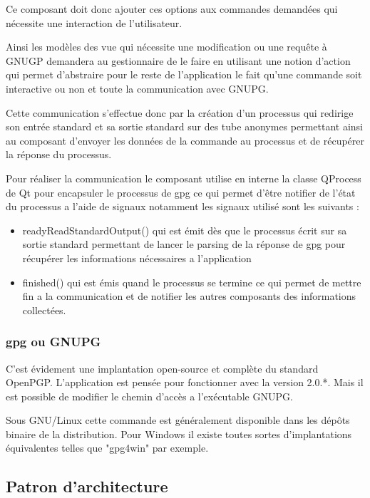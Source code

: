 \documentclass{../res/univ-projet}
\begin{document}
      Ce composant doit donc ajouter ces options aux commandes demandées qui nécessite une interaction de l'utilisateur.

      Ainsi les modèles des vue qui nécessite une modification ou une requête à GNUGP demandera au gestionnaire de le faire
      en utilisant une notion d'action qui permet d'abstraire pour le reste de l'application le fait qu'une commande soit
      interactive ou non et toute la communication avec GNUPG.

      Cette communication s'effectue donc par la création d'un processus qui redirige son entrée standard et sa sortie standard
      sur des tube anonymes permettant ainsi au composant d'envoyer les données de la commande au processus et de récupérer la
      réponse du processus.

      Pour réaliser la communication le composant utilise en interne la classe QProcess de Qt pour encapsuler le processus de gpg
      ce qui permet d'être notifier de l'état du processus a l'aide de signaux notamment les signaux utilisé sont les suivants :
      \begin{itemize}
        \item readyReadStandardOutput() qui est émit dès que le processus écrit sur sa sortie standard
        permettant de lancer le parsing de la réponse de gpg pour récupérer les informations nécessaires a l'application
        \item finished() qui est émis quand le processus se termine ce qui permet de mettre fin a la communication
        et de notifier les autres composants des informations collectées.
      \end{itemize}


    \subsubsection{gpg ou GNUPG}

      C'est évidement une implantation open-source et complète du standard OpenPGP.
      L'application est pensée pour fonctionner avec la version 2.0.*.
      Mais il est possible de modifier le chemin d’accès a l’exécutable GNUPG.

      Sous GNU/Linux cette commande est généralement disponible dans les dépôts binaire de la distribution.
      Pour Windows il existe toutes sortes d'implantations équivalentes telles que "gpg4win" par exemple.


  \newpage
  \subsection{Patron d'architecture}
\end{document}
